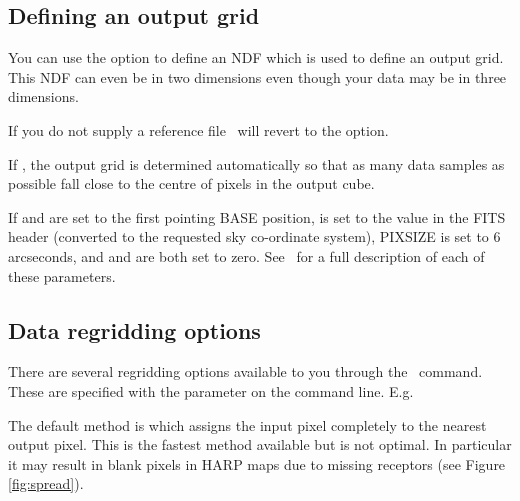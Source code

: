 \documentclass[11pt,oneside,chapters]{starlink}
\begin{document}
\subsection{Defining an output grid}
\label{sec:outputgrid}
You can use the  option to define an NDF which is used to
define an output grid. This NDF can even be in two dimensions even
though your data may be in three dimensions.
\begin{terminalv}
\end{terminalv}

If you do not supply a reference file \makecube\ will revert to the
 option.

If , the output grid is determined automatically
so that as many data samples as possible fall close to the centre of
pixels in the output cube.

If   and  are set to
the first pointing BASE position,  is set to the
 value in the FITS header (converted to the requested
sky co-ordinate system), PIXSIZE is set to 6 arcseconds, and
 and  are both set to zero. See
\smurfsun\ for a full description of each of these parameters.

\subsection{Data regridding options}
\label{sec:gridding}

There are several regridding options available to you through the
\makecube\ command. These are specified with the 
parameter on the command line. E.g.
\begin{terminalv}
\end{terminalv}

The default method is  which assigns the input pixel
completely to the nearest output pixel. This is the fastest method
available but is not optimal. In particular it may result in blank
pixels in HARP maps due to missing receptors (see Figure
\ref{fig:spread}).

\end{document}
